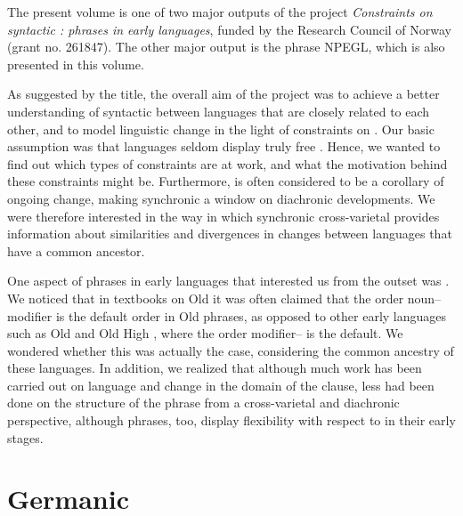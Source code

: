 \begin{refsection}

The present volume is one of two major outputs of the project \textit{Constraints on syntactic :  phrases in early  languages}, funded by the Research Council of Norway (grant no. 261847). The other major output is the  phrase  NPEGL, which is also presented in this volume. 

As suggested by the title, the overall aim of the project was to achieve a better understanding of syntactic  between languages that are closely related to each other, and to model linguistic change in the light of constraints on . Our basic assumption was that languages seldom display truly free . Hence, we wanted to find out which types of constraints are at work, and what the motivation behind these constraints might be. Furthermore,  is often considered to be a corollary of ongoing change, making synchronic  a window on diachronic developments. We were therefore interested in the way in which synchronic cross-varietal  provides information about similarities and divergences in changes between languages that have a common ancestor. 

One aspect of  phrases in early  languages that interested us from the outset was . We noticed that in textbooks on Old  it was often claimed that the order noun--modifier is the default order in Old   phrases, as opposed to other early  languages such as Old  and Old High , where the order modifier-- is the default. We wondered whether this was actually the case, considering the common ancestry of these languages. In addition, we realized that although much work has been carried out on language  and change in the domain of the clause, less had been done on the structure of the  phrase from a cross-varietal and diachronic perspective, although  phrases, too, display flexibility with respect to  in their early stages. 
  
\section*{Germanic} 


\end{refsection}
